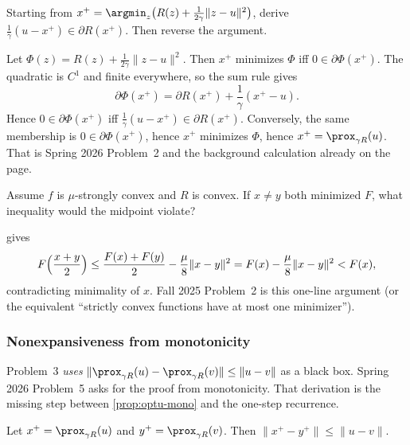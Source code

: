 \begin{exercise}
\label{ex:optu-foc}
Starting from $x^+=\argmin_z\bigl(R(z)+\tfrac1{2\gamma}\|z-u\|^2\bigr)$, derive $\frac1\gamma(u-x^+)\in\partial R(x^+)$. Then reverse the argument.
\end{exercise}

\begin{solution}
Let $\Phi(z)=R(z)+\tfrac1{2\gamma}\|z-u\|^2$. Then $x^+$ minimizes $\Phi$ iff $0\in\partial\Phi(x^+)$. The quadratic is $C^1$ and finite everywhere, so the sum rule gives
\[
\partial\Phi(x^+)
=
\partial R(x^+)+\frac1\gamma(x^+-u).
\]
Hence $0\in\partial\Phi(x^+)$ iff $\frac1\gamma(u-x^+)\in\partial R(x^+)$. Conversely, the same membership is $0\in\partial\Phi(x^+)$, hence $x^+$ minimizes $\Phi$, hence $x^+=\prox_{\gamma R}(u)$. That is Spring 2026 Problem~2 and the background calculation already on the page.
\end{solution}

\begin{exercise}
\label{ex:optu-unique}
Assume $f$ is $\mu$-strongly convex and $R$ is convex. If $x\neq y$ both minimized $F$, what inequality would the midpoint violate?
\end{exercise}

\begin{solution}
 gives
\[
F\Bigl(\frac{x+y}2\Bigr)
\le
\frac{F(x)+F(y)}2-\frac\mu8\|x-y\|^2
=
F(x)-\frac\mu8\|x-y\|^2
<
F(x),
\]
contradicting minimality of $x$. Fall 2025 Problem~2 is this one-line argument (or the equivalent ``strictly convex functions have at most one minimizer'').
\end{solution}


\subsubsection{Nonexpansiveness from monotonicity}
\label{subsubsec:optu-nonexp}

Problem~3 \emph{uses} $\|\prox_{\gamma R}(u)-\prox_{\gamma R}(v)\|\le\|u-v\|$ as a black box. Spring 2026 Problem~5 asks for the proof from monotonicity. That derivation is the missing step between \cref{prop:optu-mono} and the one-step recurrence.

\begin{proposition}
\label{prop:optu-nonexp}
Let $x^+=\prox_{\gamma R}(u)$ and $y^+=\prox_{\gamma R}(v)$. Then $\|x^+-y^+\|\le\|u-v\|$.
\end{proposition}

